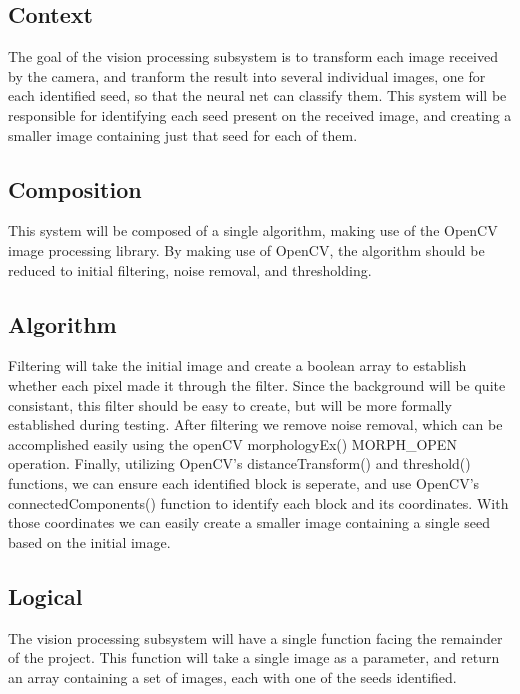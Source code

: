 
\subsection{Context}

The goal of the vision processing subsystem is to transform each image received by the camera, and tranform the result into several
individual images, one for each identified seed, so that the neural net can classify them. 
This system will be responsible for identifying each seed present on the received image,
and creating a smaller image containing just that seed for each of them.

\subsection{Composition} 

This system will be composed of a single algorithm, making use of the OpenCV image processing library.
By making use of OpenCV, the algorithm should be reduced to initial filtering, noise removal, and thresholding.

\subsection{Algorithm}
Filtering will take the initial image and create a boolean array to establish whether each pixel made it through the filter.
Since the background will be quite consistant, this filter should be easy to create, but will be more formally established during testing.
After filtering we remove noise removal, which can be accomplished easily using the openCV morphologyEx() MORPH\_OPEN operation.
Finally, utilizing OpenCV's distanceTransform() and threshold() functions, we can ensure each identified block is seperate, and use OpenCV's connectedComponents() function to identify each block and its coordinates. With those coordinates we can easily create a smaller image containing a single seed based on the initial image.





\subsection{Logical}

The vision processing subsystem will have a single function facing the remainder of the project. 
This function will take a single image as a parameter, and return an array containing
a set of images, each with one of the seeds identified. 

